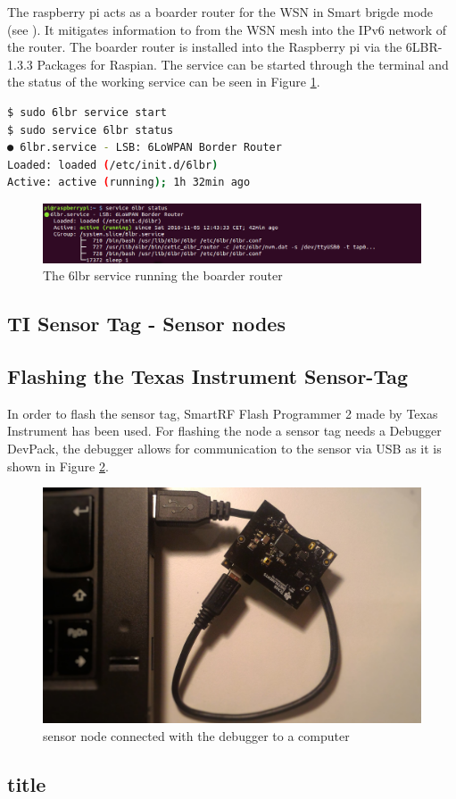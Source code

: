 The raspberry pi acts as a boarder router for the WSN in Smart brigde mode (see ). It mitigates information to from the WSN mesh into the IPv6 network of the router. The boarder router is installed into the Raspberry pi via the 6LBR-1.3.3 Packages for Raspian. The service can be started through the terminal and the status of the working service can be seen in Figure \ref{fig:router}.

\begin{lstlisting}[language=bash,caption={start the 6lbr service and check the status}]
$ sudo 6lbr service start
$ sudo service 6lbr status
● 6lbr.service - LSB: 6LoWPAN Border Router
Loaded: loaded (/etc/init.d/6lbr)
Active: active (running); 1h 32min ago
\end{lstlisting}



\begin{figure}[!h]
	\begin{center}
		\includegraphics[width=\linewidth]{serviceStatus}
		\caption{The 6lbr service running the boarder router}
		\label{fig:router}
	\end{center}
\end{figure} 

\subsection{TI Sensor Tag - Sensor nodes}



\subsection{Flashing the Texas Instrument Sensor-Tag} 
In order to flash the sensor tag, SmartRF Flash Programmer 2 made by Texas Instrument has been used. For flashing the node a sensor tag needs a Debugger DevPack, the debugger allows for communication to the sensor via USB as it is shown in Figure \ref{fig:debug}.  
\begin{figure}[!h]
	\begin{center}
		\includegraphics[width=0.8\linewidth]{debugger}
		\caption{sensor node connected with the debugger to a computer}
		\label{fig:debug}
	\end{center}
	
\end{figure} 

\subsection{title}